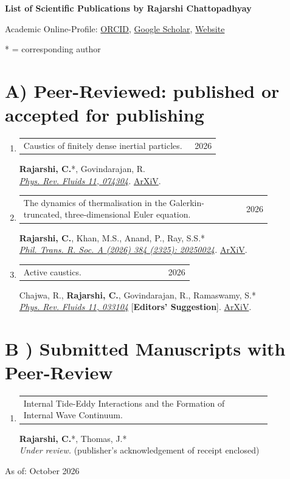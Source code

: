\documentclass[11pt,a4paper]{article}
\makeatletter
\newcommand{\cvconference}[2]{%
\begin{tabular*}{\linewidth}[t]{@{}p{0.85\linewidth}@{\extracolsep{\fill}}r@{}}
#1 & #2
\end{tabular*}
}
\makeatother
\begin{document}
\begin{center}
\textbf{\LARGE List of Scientific Publications by Rajarshi Chattopadhyay}
\end{center}

\vspace{2em}
\noindent Academic Online-Profile: \href{https://orcid.org/0009-0009-1747-3916}{ORCID}, \href{https://scholar.google.com/citations?user=nHmSWCMAAAAJ&hl=en}{Google Scholar}, \href{https://sites.google.com/view/rajarshi-edu/}{Website}

\vspace{0.5em}

 * = corresponding author

\vspace{1em}
\section*{A) Peer-Reviewed: published or accepted for publishing}
\begin{enumerate}
\item \cvconference{Caustics of finitely dense inertial particles.}{2026}
\textbf{Rajarshi, C.}*, Govindarajan, R.\\
\emph{\href{https://doi.org/10.1103/fwkk-s3w4}{Phys. Rev. Fluids 11, 074304}.}
\href{https://arxiv.org/abs/2601.14179}{ArXiV}.

\item \cvconference{The dynamics of thermalisation in the Galerkin-truncated, three-dimensional Euler equation.}{2026}
\textbf{Rajarshi, C.}, Khan, M.S., Anand, P., Ray, S.S.*\\
\emph{\href{https://doi.org/10.1098/rsta.2025.0024}{Phil. Trans. R. Soc. A (2026) 384 (2325): 20250024}.}
\href{https://arxiv.org/abs/2512.10788}{ArXiV}.

\item \cvconference{Active caustics.}{2026}
Chajwa, R., \textbf{Rajarshi, C.}, Govindarajan, R., Ramaswamy, S.*\\
\emph{\href{https://doi.org/10.1103/m3v2-bdvj}{Phys. Rev. Fluids 11, 033104}} [\textbf{Editors' Suggestion}].
\href{https://doi.org/10.48550/arXiv.2310.01829}{ArXiV}.
\end{enumerate}

\section*{B ) Submitted Manuscripts with Peer-Review}
\begin{enumerate}
\item \cvconference{Internal Tide-Eddy Interactions and the Formation of Internal Wave Continuum.}{}
\textbf{Rajarshi, C.}*, Thomas, J.*\\
\emph{Under review.} (publisher's acknowledgement of receipt enclosed)
\end{enumerate}

\vspace{1em}
\flushright \noindent\small As of: October 2026
\end{document}
